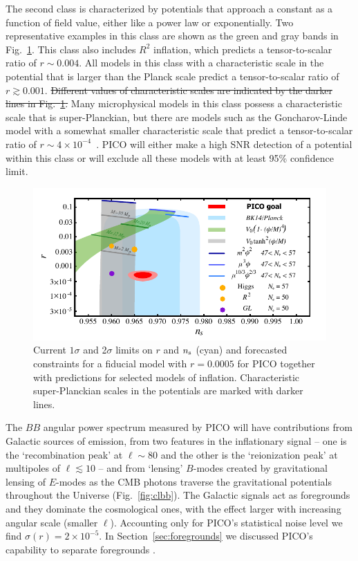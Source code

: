 \documentclass[PICOReport.tex]{subfiles}
\begin{document}
The second class is characterized by potentials that approach a constant as a function of field value, either like a power law or exponentially. Two representative examples in this class are shown as the green and gray bands in Fig.~\ref{fig:nsr}. This class also includes $R^2$ inflation, which predicts a tensor-to-scalar ratio of $r\sim 0.004$. All models in this class with a characteristic scale in the potential that is larger than the Planck scale predict a tensor-to-scalar ratio of $r\gtrsim 0.001$. \sout{Different values of characteristic scales are indicated by the darker lines in Fig.~\ref{fig:nsr}. } 
Many microphysical models in this class possess a characteristic scale that is super-Planckian, but there are models such as the Goncharov-Linde model with a somewhat smaller characteristic scale that predict a tensor-to-scalar ratio of $r\sim 4\times 10^{-4}$~\cite{Goncharov:1983mw}. PICO will either make a high \ac{SNR} detection of a potential within this class or will exclude all these models with at least 95\% confidence limit. 

\begin{figure}[!thb]
\parbox{4.5in}{\centerline{
\includegraphics[width=4.5in]{images/nsrlabeledrp0005_PICOv4p1.pdf}}}
\parbox{1.8in}{
\caption{\captiontext  Current $1\sigma$ and 2$\sigma$ limits on $r$ and $n_{\rm s}$ (cyan) and forecasted constraints for a fiducial model with $r = 0.0005$ for PICO together with predictions for selected models of inflation. Characteristic super-Planckian scales in the potentials are marked with darker lines. }
\label{fig:nsr}}
\end{figure}

The $BB$ angular power spectrum measured by PICO will have contributions from Galactic sources of emission, from two features in the inflationary signal -- one is the `recombination peak' at $\ell \sim 80$ and the other is the `reionization peak' at multipoles of $\ell\lesssim 10$ -- and from `lensing' $B$-modes created by gravitational lensing of $E$-modes as the CMB photons traverse the gravitational potentials throughout the Universe (Fig.~\ref{fig:clbb}).  The Galactic signals act as foregrounds and they dominate the cosmological ones, with the effect larger with increasing angular scale (smaller $\ell$). Accounting only for PICO's statistical noise level we find $\sigma(r) = 2\times10^{-5}$. In Section~\ref{sec:foregrounds} we discussed PICO's capability to separate foregrounds . 
\end{document}
